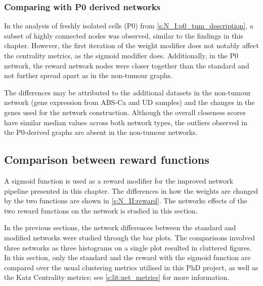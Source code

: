 \subsubsection*{Comparing with P0 derived networks}

In the analysis of freshly isolated cells (P0) from \cref{s:N_I:p0_tum_description}, a subset of highly connected nodes was observed, similar to the findings in this chapter. However, the first iteration of the weight modifier does not notably affect the centrality metrics, as the sigmoid modifier does. Additionally, in the P0 network, the reward network nodes were closer together than the standard and not further spread apart as in the non-tumour graphs.

The differences may be attributed to the additional datasets in the non-tumour network (gene expression from ABS-Ca and UD samples) and the changes in the genes used for the network construction. Although the overall closeness scores have similar median values across both network types, the outliers observed in the P0-derived graphs are absent in the non-tumour networks.


\subsection{Comparison between reward functions} \label{s:N_II:reward_comp}

A sigmoid function is used as a reward modifier for the improved network pipeline presented in this chapter. The differences in how the weights are changed by the two functions are shown in \cref{s:N_II:reward}. The networks effects of the two reward functions on the network is studied in this section.

In the previous sections, the network differences between the standard and modified networks were studied through the bar plots. The comparisons involved three networks as three histograms on a single plot resulted in cluttered figures. In this section, only the standard and the reward with the sigmoid function are compared over the usual clustering metrics utilised in this PhD project, as well as the Katz Centrality metrics; see \cref{s:lit:net_metrics} for more information.


